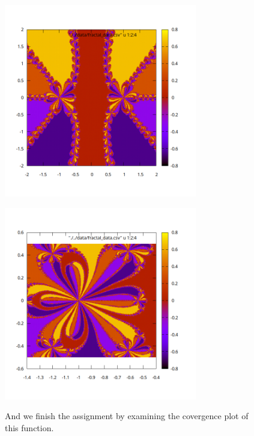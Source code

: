 \documentclass[12pt]{article}
\begin{document}
     \begin{figure}[ht]
    \centering
    \includegraphics[width=0.75\textwidth]{./../problem04/plots/fractal_plot-03_01.png}
    \label{fig:03_01}
\end{figure}
     \begin{figure}[ht]
    \centering
    \includegraphics[width=0.75\textwidth]{./../problem04/plots/fractal_plot-03_02.png}
    \label{fig:03_02}

And we finish the assignment by examining the covergence plot of this function.
\end{figure}
\end{document}
